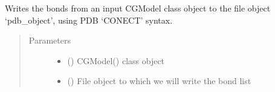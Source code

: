 \documentclass[letterpaper,12pt,english,openany,oneside]{sphinxmanual}
\begin{document}
\begin{fulllineitems}
\label{\detokenize{utilities:utilities.iotools.write_bonds}}
Writes the bonds from an input CGModel class object to the file object ‘pdb\_object’, using PDB ‘CONECT’ syntax.
\begin{quote}\begin{description}
\item[{Parameters}] \leavevmode\begin{itemize}
\item {} 
 () \textendash{} CGModel() class object

\item {} 
 () \textendash{} File object to which we will write the bond list

\end{itemize}

\end{description}\end{quote}

\end{fulllineitems}

\end{document}
